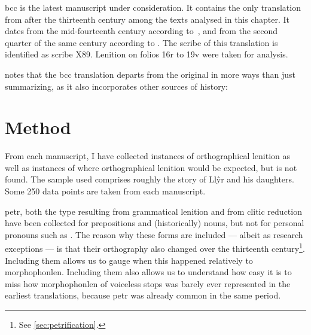 \Gls{bcc} is the latest manuscript under consideration.
It contains the only translation from after the thirteenth century among the texts analysed in this chapter.
It dates from the mid-fourteenth century according to~\textcite[xlv]{roberts_astudiaeth_1969}, and from the second quarter of the same century according to \textcite[xviii]{jones_brenhinedd_1971}.
The scribe of this  translation is identified as scribe X89.
Lenition on folios 16r to 19v were taken for analysis.

\Textcite{bowen_testunau_1974} notes that the \gls{bcc} translation departs from the original in more ways than just summarizing, as it also incorporates other sources of history:


\section{Method}
\label{sec:method}
From each manuscript, I have collected instances of orthographical
lenition as well as instances of where orthographical lenition would
be expected, but is not found. The sample used comprises roughly the
story of Llŷr and his daughters.  Some 250 data points are taken
from each manuscript.

\Gls{petr}, both the type resulting from grammatical lenition and from clitic reduction have been collected for prepositions
and (historically) nouns, but not for personal pronouns such
as . The reason why these forms are included --- albeit
as research exceptions --- is that their orthography also changed over the
thirteenth century\footnote{See \ref{sec:petrification}.}. Including them allows
us to gauge when this happened relatively to \gls{morphophonlen}.
Including them also allows us to understand how easy it is to miss how \gls{morphophonlen} of voiceless stops was barely ever represented in the earliest translations, because \gls{petr} was already common in the same period.


